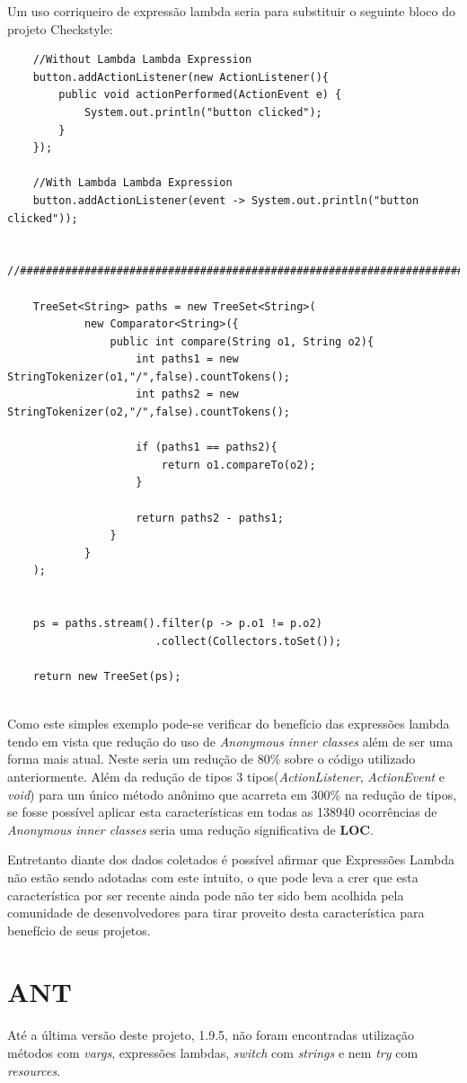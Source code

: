 Um uso corriqueiro de expressão lambda seria para substituir o seguinte bloco do projeto Checkstyle:
\begin{lstlisting}
	//Without Lambda Lambda Expression
	button.addActionListener(new ActionListener(){
		public void actionPerformed(ActionEvent e) {
			System.out.println("button clicked");
		}
	});

	//With Lambda Lambda Expression
	button.addActionListener(event -> System.out.println("button clicked"));
	
	//###########################################################################
	
	TreeSet<String> paths = new TreeSet<String>(
			new Comparator<String>({
				public int compare(String o1, String o2){
					int paths1 = new StringTokenizer(o1,"/",false).countTokens();
					int paths2 = new StringTokenizer(o2,"/",false).countTokens();
				
					if (paths1 == paths2){
						return o1.compareTo(o2);
					}
				
					return paths2 - paths1;
				}
			}
	);
	
	
	ps = paths.stream().filter(p -> p.o1 != p.o2)
					   .collect(Collectors.toSet());
	
	return new TreeSet(ps);
	
\end{lstlisting}

Como este simples exemplo pode-se verificar do benefício das expressões lambda tendo em vista que  redução do uso de \textit{Anonymous inner classes} além de ser uma forma mais atual. Neste seria um redução de 80\% sobre o código utilizado anteriormente. Além da redução de tipos 3 tipos(\textit{ActionListener}, \textit{ActionEvent} e \textit{void}) para um único método anônimo que acarreta em 300\% na redução de tipos,  se fosse possível aplicar esta características em todas as 138940 ocorrências de \textit{Anonymous inner classes} seria uma redução significativa de \textbf{LOC}.

Entretanto diante dos dados coletados é possível afirmar que Expressões Lambda não estão sendo adotadas com este intuito, o que pode leva a crer que esta característica por ser recente ainda pode não ter sido bem acolhida pela comunidade de desenvolvedores para tirar proveito desta  característica para benefício de seus projetos.\\




\section{ANT}
Até a última versão deste projeto, 1.9.5, não foram encontradas utilização métodos com \textit{vargs}, expressões lambdas, \textit{switch} com \textit{strings} e nem \textit{try} com \textit{resources}.\\

